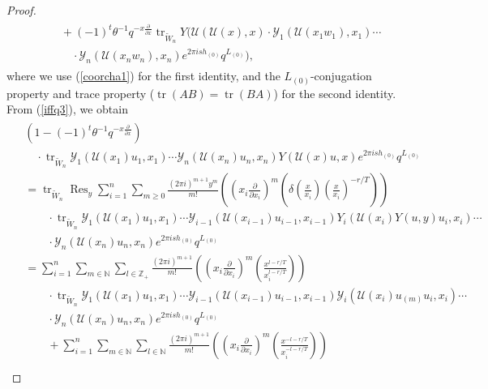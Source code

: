 \documentclass[10pt,a4paper]{amsart}
\newcommand{\Res}{\operatorname{Res}}
\newcommand{\Y}{\mathcal{Y}}
\begin{document}
\begin{proof}
\begin{align}
\begin{split}
&\quad + (-1)^{t} \theta^{-1} q^{-x \frac{\partial}{\partial x}} 
\operatorname{tr}_{\tilde{W}_n} Y\big( \mathcal{U}(\mathcal{U}(x),x) \cdot 
\mathcal{Y}_1(\mathcal{U}(x_1 w_1),x_1) \cdots \\
&\qquad \cdot \mathcal{Y}_n(\mathcal{U}(x_n w_n),x_n)
e^{2\pi i s h_{(0)}} q^{L_{(0)}} \big),
\end{split}
\end{align}
where we use (\ref{coorcha1}) for the first identity, and the $L_{(0)}$-conjugation property and trace property ($\operatorname{tr}(AB) = \operatorname{tr}(BA)$) for the second identity. From (\ref{iffq3}), we obtain
\begin{align}\label{iffq4}
\begin{split}
  &(1 - (-1)^t \theta^{-1} q^{-x\frac{\partial}{\partial x}}) \\
  &\quad \cdot \operatorname{tr}_{\tilde{W}_n}
    \Y_1(\mathcal{U}(x_1)u_1,x_1) \cdots \Y_n(\mathcal{U}(x_n)u_n,x_n)
    Y(\mathcal{U}(x)u,x) e^{2\pi i s h_{(0)}} q^{L_{(0)}} \\
  &=
    \operatorname{tr}_{\tilde{W}_n}
    \Res_{y} \sum_{i=1}^{n} \sum_{m \geq 0}
    \frac{(2\pi i)^{m+1} y^m}{m!}
    \left( \left( x_i \frac{\partial}{\partial x_i} \right)^m
    \left( \delta\left( \frac{x}{x_i} \right)
    \left( \frac{x}{x_i} \right)^{-r/T} \right) \right) \\
  &\quad\quad\cdot
    \operatorname{tr}_{\tilde{W}_n}
    \Y_1(\mathcal{U}(x_1)u_1,x_1) \cdots
    \Y_{i-1}(\mathcal{U}(x_{i-1})u_{i-1},x_{i-1})
    Y_i(\mathcal{U}(x_i)Y(u,y)u_i,x_i) \cdots \\
  &\quad\quad\cdot
    \Y_n(\mathcal{U}(x_n)u_n,x_n) e^{2\pi i s h_{(0)}} q^{L_{(0)}} \\
  &=
    \sum_{i=1}^n \sum_{m \in \mathbb{N}} \sum_{l \in \mathbb{Z}_+}
    \frac{(2\pi i)^{m+1}}{m!}
    \left( \left( x_i \frac{\partial}{\partial x_i} \right)^m
    \left( \frac{x^{l - r/T}}{x_i^{l - r/T}} \right) \right) \\
  &\quad\quad\cdot
    \operatorname{tr}_{\tilde{W}_n}
    \Y_1(\mathcal{U}(x_1)u_1,x_1) \cdots
    \Y_{i-1}(\mathcal{U}(x_{i-1})u_{i-1},x_{i-1})
    \Y_i(\mathcal{U}(x_i)u_{(m)}u_i,x_i) \cdots \\
  &\quad\quad\cdot
    \Y_n(\mathcal{U}(x_n)u_n,x_n) e^{2\pi i s h_{(0)}} q^{L_{(0)}} \\
  &\quad\quad
    + \sum_{i=1}^n \sum_{m \in \mathbb{N}} \sum_{l \in \mathbb{N}}
    \frac{(2\pi i)^{m+1}}{m!}
    \left( \left( x_i \frac{\partial}{\partial x_i} \right)^m
    \left( \frac{x^{-l - r/T}}{x_i^{-l - r/T}} \right) \right) \\

\end{split}
\end{align}
\end{proof}
\end{document}
